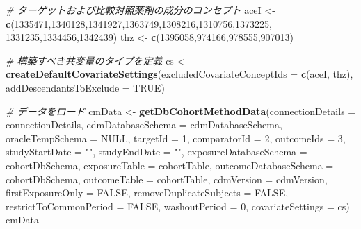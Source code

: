 \documentclass[
  11pt]{book}
\newenvironment{Shaded}{\begin{snugshade}}{\end{snugshade}}
\newcommand{\AttributeTok}[1]{\textcolor[rgb]{0.13,0.29,0.53}{#1}}
\newcommand{\CommentTok}[1]{\textcolor[rgb]{0.56,0.35,0.01}{\textit{#1}}}
\newcommand{\ConstantTok}[1]{\textcolor[rgb]{0.56,0.35,0.01}{#1}}
\newcommand{\DecValTok}[1]{\textcolor[rgb]{0.00,0.00,0.81}{#1}}
\newcommand{\FunctionTok}[1]{\textcolor[rgb]{0.13,0.29,0.53}{\textbf{#1}}}
\newcommand{\NormalTok}[1]{#1}
\newcommand{\OtherTok}[1]{\textcolor[rgb]{0.56,0.35,0.01}{#1}}
\newcommand{\StringTok}[1]{\textcolor[rgb]{0.31,0.60,0.02}{#1}}
\theoremstyle{definition}
\theoremstyle{definition}
\theoremstyle{definition}
\theoremstyle{definition}
\theoremstyle{remark}
\begin{document}
\begin{Shaded}
\begin{Highlighting}[]
\CommentTok{\# ターゲットおよび比較対照薬剤の成分のコンセプト}
\NormalTok{aceI }\OtherTok{\textless{}{-}} \FunctionTok{c}\NormalTok{(}\DecValTok{1335471}\NormalTok{,}\DecValTok{1340128}\NormalTok{,}\DecValTok{1341927}\NormalTok{,}\DecValTok{1363749}\NormalTok{,}\DecValTok{1308216}\NormalTok{,}\DecValTok{1310756}\NormalTok{,}\DecValTok{1373225}\NormalTok{,}
          \DecValTok{1331235}\NormalTok{,}\DecValTok{1334456}\NormalTok{,}\DecValTok{1342439}\NormalTok{)}
\NormalTok{thz }\OtherTok{\textless{}{-}} \FunctionTok{c}\NormalTok{(}\DecValTok{1395058}\NormalTok{,}\DecValTok{974166}\NormalTok{,}\DecValTok{978555}\NormalTok{,}\DecValTok{907013}\NormalTok{)}

\CommentTok{\# 構築すべき共変量のタイプを定義}
\NormalTok{cs }\OtherTok{\textless{}{-}} \FunctionTok{createDefaultCovariateSettings}\NormalTok{(}\AttributeTok{excludedCovariateConceptIds =} \FunctionTok{c}\NormalTok{(aceI,}
\NormalTok{                                                                     thz),}
                                     \AttributeTok{addDescendantsToExclude =} \ConstantTok{TRUE}\NormalTok{)}

\CommentTok{\# データをロード}
\NormalTok{cmData }\OtherTok{\textless{}{-}} \FunctionTok{getDbCohortMethodData}\NormalTok{(}\AttributeTok{connectionDetails =}\NormalTok{ connectionDetails,}
                                \AttributeTok{cdmDatabaseSchema =}\NormalTok{ cdmDatabaseSchema,}
                                \AttributeTok{oracleTempSchema =} \ConstantTok{NULL}\NormalTok{,}
                                \AttributeTok{targetId =} \DecValTok{1}\NormalTok{,}
                                \AttributeTok{comparatorId =} \DecValTok{2}\NormalTok{,}
                                \AttributeTok{outcomeIds =} \DecValTok{3}\NormalTok{,}
                                \AttributeTok{studyStartDate =} \StringTok{""}\NormalTok{,}
                                \AttributeTok{studyEndDate =} \StringTok{""}\NormalTok{,}
                                \AttributeTok{exposureDatabaseSchema =}\NormalTok{ cohortDbSchema,}
                                \AttributeTok{exposureTable =}\NormalTok{ cohortTable,}
                                \AttributeTok{outcomeDatabaseSchema =}\NormalTok{ cohortDbSchema,}
                                \AttributeTok{outcomeTable =}\NormalTok{ cohortTable,}
                                \AttributeTok{cdmVersion =}\NormalTok{ cdmVersion,}
                                \AttributeTok{firstExposureOnly =} \ConstantTok{FALSE}\NormalTok{,}
                                \AttributeTok{removeDuplicateSubjects =} \ConstantTok{FALSE}\NormalTok{,}
                                \AttributeTok{restrictToCommonPeriod =} \ConstantTok{FALSE}\NormalTok{,}
                                \AttributeTok{washoutPeriod =} \DecValTok{0}\NormalTok{,}
                                \AttributeTok{covariateSettings =}\NormalTok{ cs)}
\NormalTok{cmData}
\end{Highlighting}
\end{Shaded}
\end{document}
